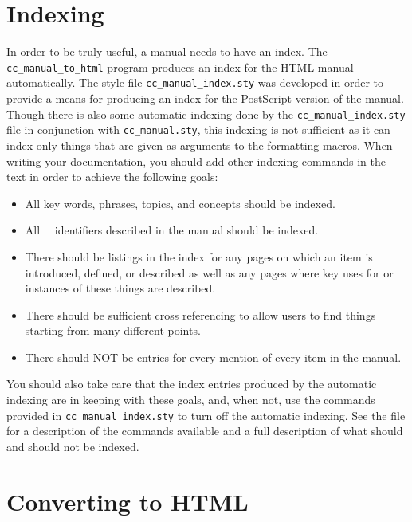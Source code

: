 \section{Indexing}
\label{sec:indexing}

In order to be truly useful, a manual needs to have an index.  The 
{\tt cc\_manual\_to\_html} program produces an index for the HTML manual
automatically.  %
The style file {\tt cc\_manual\_index.sty}%
 was developed in order to provide
a means for producing an index for the PostScript version of the manual.  
Though there is also some automatic indexing done by the
{\tt cc\_manual\_index.sty} file in conjunction with {\tt cc\_manual.sty},
this indexing is not sufficient as it can index only things that are
given as arguments to the formatting macros.  When writing your
documentation, you should add other indexing commands in the text in
order to achieve the following goals:
\begin{itemize}
   \item All key words, phrases, topics, and concepts should be indexed.
   \item All \cgal\ \CC\ identifiers described in the manual should be indexed.
   \item There should be listings in the index for any pages on which an
         item is introduced, defined, or described as well as any pages
         where key uses for or instances of these things are described.
   \item There should be sufficient cross referencing to allow users
         to find things starting from many different points.
   \item There should NOT be entries for every mention of every item in the
         manual.
\end{itemize}

You should also take care that the index entries produced by the automatic
indexing are in keeping with these goals, and, when not, use the commands
provided in {\tt cc\_manual\_index.sty} to turn off the automatic indexing.
See the file 
for a description of the commands available and a full description of what
should and should not be indexed.

\section{Converting to HTML}
\label{sec:html_conversion}

